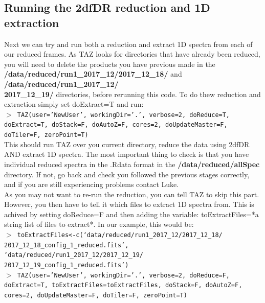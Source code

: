 \documentclass[12pt]{article}
\begin{document}
\subsection{Running the 2dfDR reduction and 1D extraction}

Next we can try and run both a reduction and extract 1D spectra from each of our reduced frames. As TAZ looks for directories that have already been reduced, you will need to delete the products you have previous made in the \textbf{/data/reduced/run1\_2017\_12/2017\_12\_18/} and \textbf{/data/reduced/run1\_2017\_12/ \\ 2017\_12\_19/} directories, before rerunning this code. To do thew reduction and extraction simply set doExtract=T and run:\\

\hspace{10mm} \texttt{$>$ TAZ(user='NewUser', workingDir='.', verbose=2, doReduce=T, doExtract=T, doStack=F, doAutoZ=F, cores=2, doUpdateMaster=F, doTiler=F, zeroPoint=T)}\\

This should run TAZ over you current directory, reduce the data using 2dfDR AND extract 1D spectra. The most important thing to check is that you have individual reduced spectra in the .Rdata format in the \textbf{/data/reduced/allSpec} directory. If not, go back and check you followed the previous stages correctly, and if you are still experiencing problems contact Luke.  \\

As you may not want to re-run the reduction, you can tell TAZ to skip this part. However, you then have to tell it which files to extract 1D spectra from. This is achived by setting  doReduce=F and then adding the variable: toExtractFiles=*a string list of files to extract*. In our example, this would be:\\

 \hspace{10mm} \texttt{$>$ toExtractFiles<-c(`data/reduced/run1\_2017\_12/2017\_12\_18/ \\ 2017\_12\_18\_config\_1\_reduced.fits', `data/reduced/run1\_2017\_12/2017\_12\_19/ \\ 2017\_12\_19\_config\_1\_reduced.fits')}\\
 
  \hspace{10mm} \texttt{$>$ TAZ(user='NewUser', workingDir='.', verbose=2, doReduce=F, doExtract=T, toExtractFiles=toExtractFiles, doStack=F, doAutoZ=F, cores=2, doUpdateMaster=F, doTiler=F, zeroPoint=T)}\\
\end{document}
